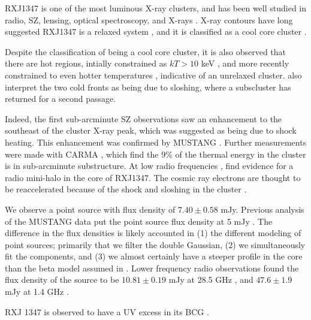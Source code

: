 
RXJ1347 is one of the most luminous X-ray clusters, and has been well studied in radio, SZ, lensing, optical
spectroscopy, and X-rays \citep[e.g.][]{schindler1995,allen2002, pointecouteau1999,komatsu2001,kitayama2004,
gitti2007b,ota2008,bradac2008,miranda2008}. X-ray contours have long suggested RXJ1347 is a relaxed system
\citep[e.g.][]{schindler1997}, and it is classified as a cool core cluster \citep[e.g.][]{mann2012,sayers2013}. 

Despite
the classification of being a cool core cluster, it is also observed that there are hot regions, intially
constrained as $kT > 10$ keV \citep[e.g.][]{allen2002,bradac2008}, and more recently constrained to even
hotter temperatures \citep[$kT > 20$ keV][]{johnson2012}, indicative of an unrelaxed cluster. 
\citet{johnson2012} also interpret the two cold fronts as being due to sloshing, where a subscluster has returned
for a second passage.

Indeed, the first sub-arcminute SZ observations \citep{komatsu2001,kitayama2004} saw an enhancement to
the southeast of the cluster X-ray peak, which was suggested as being due to shock heating. This enhancement
was confirmed by MUSTANG \citep{mason2010}. Further measurements were made with CARMA \citep{plagge2013},
which find the 9\% of the thermal energy in the cluster is in sub-arcminute substructure.
At low radio frequencies \citep[][237 MHz and 614 MHz]{ferrari2011},
\citep[][1.4 GHz]{gitti2007a} find evidence for a radio mini-halo in the core of RXJ1347. The cosmic ray electrons
are thought to be reaccelerated because of the shock and sloshing in the cluster \citep{ferrari2011}.

We observe a point source with flux density of $7.40 \pm 0.58$ mJy. Previous analysis of the MUSTANG data put
the point source flux density at 5 mJy \citep{mason2010}. The difference in the flux densities is likely accounted
in (1) the different modeling of point sources; primarily that we filter the double Gaussian, (2) we simultaneously
fit the components, and (3) we almost certainly have a steeper profile in the core than the beta model assumed in
\citet{mason2010}. Lower frequency radio observations found the
flux density of the source to be $10.81 \pm 0.19$ mJy at 28.5 GHz \citep{reese2002}, and $47.6 \pm 1.9$
mJy at 1.4 GHz \citep{condon1998}.

RXJ 1347 is observed to have a UV excess in its BCG \citep{donahue2014}. 

